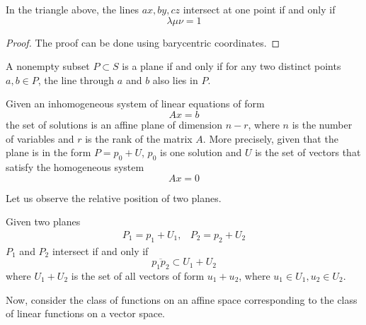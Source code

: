   \begin{corollary}
    In the triangle above, the lines $ax, by, cz$ intersect at one point if and only if 
    \begin{equation}
      \lambda \mu \nu = 1
    \end{equation}
  \end{corollary}
  \begin{proof}
    The proof can be done using barycentric coordinates. 
  \end{proof}

  \begin{theorem}
    A nonempty subset $P \subset S$ is a plane if and only if for any two distinct points $a, b \in P$, the line through $a$ and $b$ also lies in $P$. 
  \end{theorem}

  \begin{theorem}
    Given an inhomogeneous system of linear equations of form 
    \begin{equation}
      A x = b
    \end{equation}
    the set of solutions is an affine plane of dimension $n-r$, where $n$ is the number of variables and $r$ is the rank of the matrix $A$. More precisely, given that the plane is in the form $P = p_0 + U$, $p_0$ is one solution and $U$ is the set of vectors that satisfy the homogeneous system
    \begin{equation}
      Ax = 0
    \end{equation}
  \end{theorem}

  Let us observe the relative position of two planes. 

  \begin{theorem}
    Given two planes 
    \begin{align*}
      P_1 = p_1 + U_1, & P_2 = p_2 + U_2
    \end{align*}
    $P_1$ and $P_2$ intersect if and only if 
    \begin{equation}
      \overline{p_1 p_2} \subset U_1 + U_2
    \end{equation}
    where $U_1 + U_2$ is the set of all vectors of form $u_1 + u_2$, where $u_1 \in U_1, u_2 \in U_2$. 
  \end{theorem}

  Now, consider the class of functions on an affine space corresponding to the class of linear functions on a vector space. 

